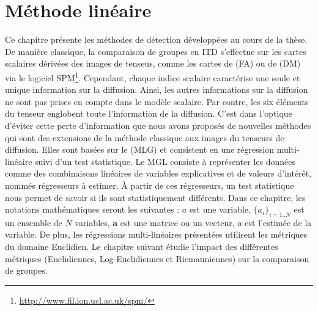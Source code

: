 
\chapter{Méthode linéaire}
\label{Chapter4}

Ce chapitre présente les méthodes de détection développées au cours de la thèse.
De manière classique, la comparaison de groupes en ITD s'effectue sur les cartes scalaires dérivées des images de tenseus, 
comme les cartes de \fa (FA) ou de \md (DM) via le logiciel SPM\footnote{\url{http://www.fil.ion.ucl.ac.uk/spm/}}.
Cependant, chaque indice scalaire caractérise une seule et unique information sur la diffusion.
Ainsi, les autres informations sur la diffusion ne sont pas prises en compte dans le modèle scalaire.
Par contre, les six éléments du tenseur englobent toute l'information de la diffusion.
C'est dans l'optique d'éviter cette perte d'information que nous avons proposés de nouvelles méthodes 
qui sont des extensions de la méthode classique aux images du tenseurs de diffusion.
Elles sont basées sur le \mlg (MLG) et consistent en une régression multi-linéaire suivi d'un test statistique.
Le MGL consiste à représenter les données comme des combinaisons linéaires de variables explicatives et de valeurs d'intérêt, nommés régresseurs à  estimer.
À partir de ces régresseurs, un test statistique nous permet de savoir si ils sont statistiquement différents.
Dans ce chapitre, les notations mathématiques seront les suivantes : $a$ est une variable, $\{a_i\}_{i=1..N}$ est un ensemble de $N$ variables, 
$\mathbf{a}$ est une matrice ou un vecteur, $\hat{a}$ est l'estimée de la variable.
De plus, les régressions multi-linéaires présentées utilisent les métriques du domaine Euclidien.
Le chapitre suivant étudie l'impact des différentes métriques (Euclidiennes, Log-Euclidiennes et Riemanniennes) sur la comparaison de groupes.\\



